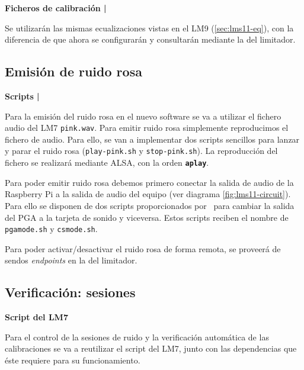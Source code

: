 \begin{flushright}
\textbf{Ficheros de calibración | }
\end{flushright}

Se utilizarán las mismas ecualizaciones vistas en el \acrshort{LM9} (\ref{sec:lms11-eq}), con la diferencia de que ahora se configurarán y consultarán mediante la  del limitador.

\subsection{Emisión de ruido rosa}

\begin{flushright}
\textbf{Scripts | }
\end{flushright}

Para la emisión del ruido rosa en el nuevo software se va a utilizar el fichero audio del \acrshort{LM7} \texttt{pink.wav}. Para emitir ruido rosa simplemente reproducimos el fichero de audio. Para ello, se van a implementar dos scripts sencillos para lanzar y parar el ruido rosa (\texttt{play-pink.sh} y \texttt{stop-pink.sh}). La reproducción del fichero se realizará mediante \acrshort{ALSA}, con la orden \texttt{\textbf{aplay}}.

Para poder emitir ruido rosa debemos primero conectar la salida de audio de la Raspberry Pi a la salida de audio del equipo (ver diagrama \ref{fig:lms11-circuit}). Para ello se disponen de dos scripts proporcionados por \myMateLuis\ para cambiar la salida del \acrshort{PGA} a la tarjeta de sonido y viceversa. Estos scripts reciben el nombre de \texttt{pgamode.sh} y \texttt{csmode.sh}.

Para poder activar/desactivar el ruido rosa de forma remota, se proveerá de sendos \textit{endpoints} en la  del limitador.

\subsection{Verificación: sesiones}

\begin{flushright}
\textbf{Script del \acrshort{LM7}}
\end{flushright}

Para el control de la sesiones de ruido y la verificación automática de las calibraciones se va a reutilizar el script del \acrshort{LM7}, junto con las dependencias que éste requiere para su funcionamiento.

